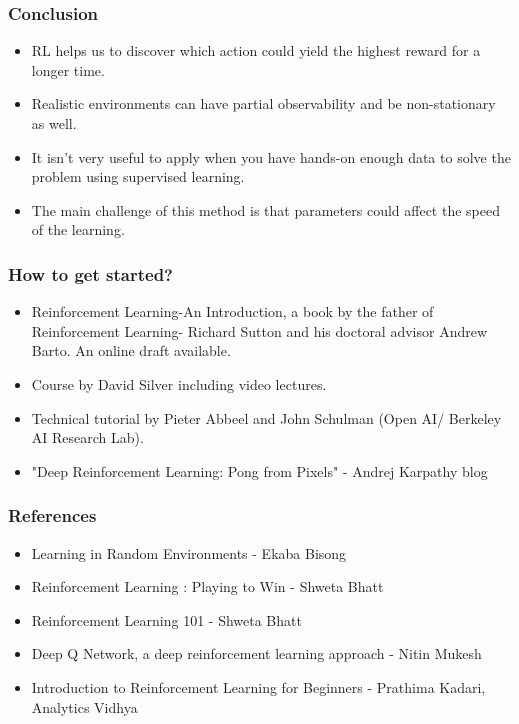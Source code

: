 \begin{frame}[fragile]\frametitle{Conclusion}

\begin{itemize}
\item RL helps us to discover which action could yield the highest reward for a longer time. 
\item Realistic environments can have partial observability and be non-stationary as well. 
\item It isn’t very useful to apply when you have hands-on enough data to solve the problem using supervised learning. \item The main challenge of this method is that parameters could affect the speed of the learning.
\end{itemize}



\end{frame}

\begin{frame}[fragile]\frametitle{How to get started?}

\begin{itemize}
\item Reinforcement Learning-An Introduction, a book by the father of Reinforcement Learning- Richard Sutton and his doctoral advisor Andrew Barto. An online draft available.
\item Course by David Silver including video lectures.
\item Technical tutorial by Pieter Abbeel and John Schulman (Open AI/ Berkeley AI Research Lab).
\item "Deep Reinforcement Learning: Pong from Pixels" - Andrej Karpathy blog
\end{itemize}

\end{frame}


\begin{frame}\frametitle{References}
\begin{itemize}
\item Learning in Random Environments - Ekaba Bisong
\item Reinforcement Learning : Playing to Win - Shweta Bhatt
\item Reinforcement Learning 101 - Shweta Bhatt
\item Deep Q Network, a deep reinforcement learning approach - Nitin Mukesh
\item Introduction to Reinforcement Learning for Beginners -  Prathima Kadari, Analytics Vidhya
\end{itemize}
\end{frame}